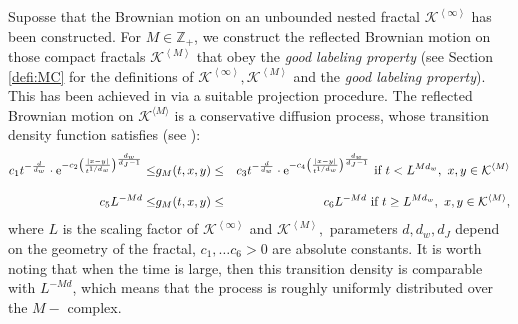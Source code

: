 \documentclass[11pt]{article}
\begin{document}
Suposse that the Brownian motion on an unbounded nested fractal $\mathcal{K}^{\left\langle \infty \right\rangle}$ has been constructed. For $M \in \mathbb{Z_+}$, we  construct the reflected Brownian motion on those compact fractals $\mathcal{K}^{\left\langle M \right\rangle}$  that obey the {\em good labeling property} (see Section \ref{defi:MC} for the definitions of $\mathcal{K}^{\left\langle \infty \right\rangle}, \mathcal{K}^{\left\langle M \right\rangle}$ and the \textit{good labeling property}). This has been achieved in \cite{bib:KOP} via a suitable projection procedure. The reflected Brownian motion on $\mathcal K^{\langle M\rangle}$  is a conservative diffusion process, whose transition density function satisfies  (see \cite{Olszewski}):
\begin{eqnarray*}
c_1t^{-\frac{d}{d_{w}}} \cdot {\rm e}^{-c_2\left(\frac{|x-y|}{t^{1/d_w}}\right)^\frac{d_w}{{d_{J}-1}}}  \leq & g_{M}(t,x,y) \leq & c_3 t^{-\frac{d}{d_{w}}} \cdot {\rm e}^{-c_4\left(\frac{|x-y|}{t^{1/d_w}}\right)^\frac{d_w}{{d_{J}-1}}} \mbox{ if } t<L^{Md_{w}}, \ x,y \in \mathcal{K}^{\left\langle M \right\rangle}\\[3mm]
c_5L^{-Md} \leq & g_{M}(t,x,y) \leq & c_6L^{-Md} \mbox{ if } t \geq L^{Md_{w}}, \ x,y \in \mathcal{K}^{\left\langle M \right\rangle},
\end{eqnarray*}
where $L$ is the scaling factor of $\mathcal{K}^{\left\langle \infty \right\rangle}$ and $\mathcal{K}^{\left\langle M \right\rangle},$ parameters $d, d_w, d_J$ depend on the geometry of the fractal, $c_1,\ldots c_6 > 0$ are absolute constants.
It is worth noting that when the time is large, then this transition density is comparable with $L^{-Md}$, which means that the process is roughly uniformly distributed over the $M-$ complex.

\
\end{document}

